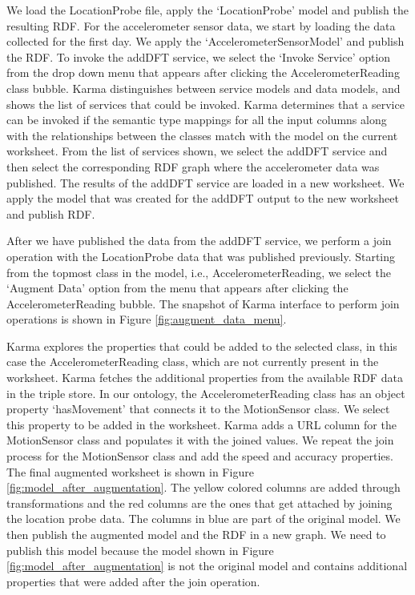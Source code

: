 We load the LocationProbe file, apply the `LocationProbe' model and publish the resulting RDF. For the accelerometer sensor data, we start by loading the data collected for the first day. We apply the `AccelerometerSensorModel' and publish the RDF. To invoke the addDFT service, we select the `Invoke Service' option from the drop down menu that appears after clicking the AccelerometerReading class bubble. Karma distinguishes between service models and data models, and shows the list of services that could be invoked. Karma determines that a service can be invoked if the semantic type mappings for all the input columns along with the relationships between the classes match with the model on the current worksheet. From the list of services shown, we select the addDFT service and then select the corresponding RDF graph where the accelerometer data was published. The results of the addDFT service are loaded in a new worksheet. We apply the model that was created for the addDFT output to the new worksheet and publish RDF.

After we have published the data from the addDFT service, we perform a join operation with the LocationProbe data that was published previously. Starting from the topmost class in the model, i.e., AccelerometerReading, we select the `Augment Data' option from the menu that appears after clicking the AccelerometerReading bubble. The snapshot of Karma interface to perform join operations is shown in Figure \ref{fig:augment_data_menu}.

Karma explores the properties that could be added to the selected class, in this case the AccelerometerReading class, which are not currently present in the worksheet. Karma fetches the additional properties from the available RDF data in the triple store. In our ontology, the AccelerometerReading class has an object property `hasMovement' that connects it to the MotionSensor class. We select this property to be added in the worksheet. Karma adds a URL column for the MotionSensor class and populates it with the joined values. We repeat the join process for the MotionSensor class and add the speed and accuracy properties. The final augmented worksheet is shown in Figure \ref{fig:model_after_augmentation}. The yellow colored columns are added through transformations and the red columns are the ones that get attached by joining the location probe data. The columns in blue are part of the original model. We then publish the augmented model and the RDF in a new graph. We need to publish this model because the model shown in Figure \ref{fig:model_after_augmentation} is not the original model and contains additional properties that were added after the join operation. 

